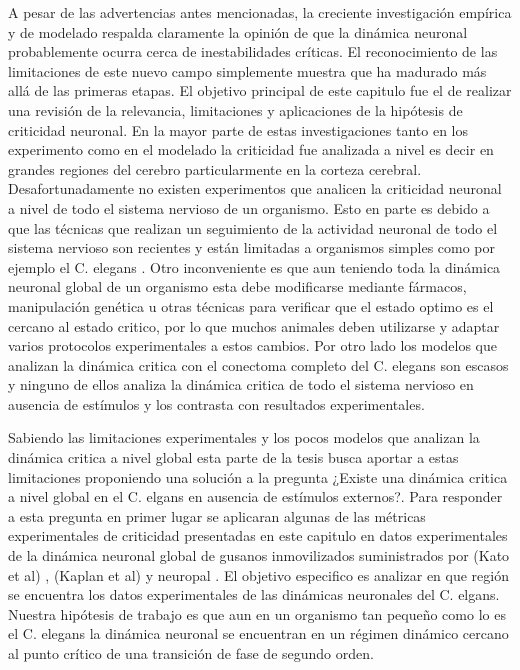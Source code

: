 A pesar de las advertencias antes mencionadas, la creciente investigación empírica y de modelado respalda claramente la opinión de que la dinámica neuronal probablemente ocurra cerca de inestabilidades críticas. El reconocimiento de las limitaciones de este nuevo campo simplemente muestra que ha madurado más allá de las primeras etapas. El objetivo principal de este capitulo fue el de realizar una revisión de la relevancia, limitaciones y aplicaciones de la hipótesis de criticidad neuronal.   En la mayor parte de estas investigaciones tanto en los experimento  como en  el modelado  la criticidad fue analizada a nivel  es decir en grandes regiones del cerebro particularmente en la corteza cerebral.  Desafortunadamente no existen experimentos que analicen la criticidad neuronal a nivel de todo el sistema nervioso de un organismo. Esto en parte es debido a que las técnicas que realizan  un seguimiento de la actividad neuronal de todo el sistema nervioso  son  recientes y están limitadas a organismos simples como por ejemplo el C. elegans \cite{kato_global_2015,kaplan_nested_2020,yemini_neuropal_2021}. Otro inconveniente es que aun teniendo toda la dinámica neuronal global  de un organismo esta debe modificarse  mediante fármacos, manipulación genética u otras técnicas para verificar que el estado optimo es el cercano al estado critico, por lo que muchos animales deben utilizarse y adaptar varios protocolos experimentales a estos cambios. Por otro lado los modelos que analizan la dinámica  critica  con el  conectoma completo del C. elegans son escasos  \cite{ciftci_synaptic_2018} y ninguno de ellos  analiza la dinámica critica de todo el sistema nervioso en ausencia de estímulos y los contrasta con resultados experimentales.

Sabiendo las limitaciones experimentales y los pocos modelos que analizan la dinámica critica a nivel global esta parte de la tesis busca  aportar  a estas limitaciones proponiendo una solución a la pregunta ¿Existe una dinámica critica a nivel global en el C. elgans  en ausencia de estímulos
externos?. Para responder a esta pregunta  en primer lugar  se aplicaran  algunas de las métricas experimentales de criticidad presentadas en este capitulo  en  datos experimentales de la dinámica neuronal global de  gusanos inmovilizados suministrados por (Kato et al) \cite{kato_global_2015}, (Kaplan et al)  \cite{kaplan_nested_2020} y neuropal \cite{yemini_neuropal_2021}.  El  objetivo especifico es analizar en que región se encuentra los datos experimentales de las   dinámicas neuronales del C. elgans.  Nuestra hipótesis de trabajo es que aun en un organismo tan pequeño como lo es el C. elegans la dinámica neuronal se encuentran en un régimen dinámico cercano al punto crítico de una transición de fase de segundo orden.


